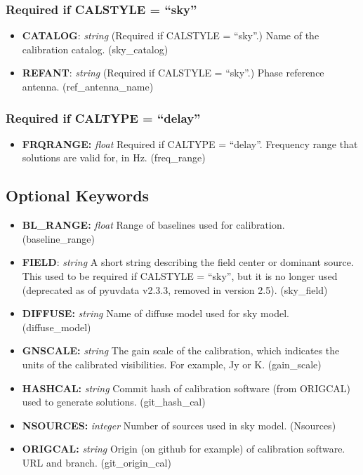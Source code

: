 \documentclass[11pt, oneside, english]{article}   	%
\begin{document}
	\subsubsection{Required if CALSTYLE = ``sky''}
	\begin{itemize}
	\item{\textbf{CATALOG}: \emph{string} (Required if CALSTYLE = ``sky''.) Name of the calibration catalog. (sky\_catalog)}
	\item{\textbf{REFANT}: \emph{string} (Required if CALSTYLE = ``sky''.) Phase reference antenna. (ref\_antenna\_name)}
	\end{itemize}
	
	
	\subsubsection{Required if CALTYPE = ``delay''}
	\begin{itemize}
	\item{\textbf{FRQRANGE:} \emph{float} Required if CALTYPE = ``delay''. Frequency range that solutions are valid for, in Hz. (freq\_range)}
	\end{itemize}
	
	
\subsection{Optional Keywords}
\begin{itemize}
\item{\textbf{BL\_RANGE:} \emph{float} Range of baselines used for calibration. (baseline\_range)}
\item{\textbf{FIELD}: \emph{string} A short string describing the field center or dominant source. 
This used to be required if CALSTYLE = ``sky'', but it is no longer used (deprecated as
of pyuvdata v2.3.3, removed in version 2.5). (sky\_field)}
\item{\textbf{DIFFUSE:} \emph{string} Name of diffuse model used for sky model. (diffuse\_model)}
\item{\textbf{GNSCALE:} \emph{string} The gain scale of the calibration, which indicates the units of the calibrated visibilities. For example, Jy or K. (gain\_scale)}
\item{\textbf{HASHCAL:} \emph{string} Commit hash of calibration software (from ORIGCAL) used to generate solutions. (git\_hash\_cal)}
\item{\textbf{NSOURCES:} \emph{integer} Number of sources used in sky model. (Nsources)}
\item{\textbf{ORIGCAL:} \emph{string} Origin (on github for example) of calibration software. URL and branch. (git\_origin\_cal)}
\end{itemize}
\end{document}
